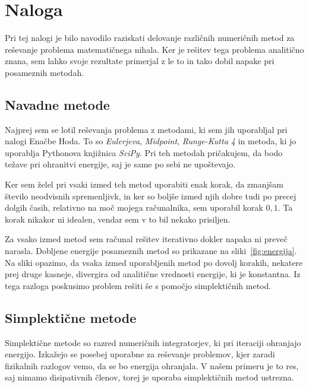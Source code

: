 \documentclass{porocilo}
\begin{document}
\section{Naloga}
Pri tej nalogi je bilo navodilo raziskati delovanje različnih numeričnih metod za reševanje problema matematičnega nihala. Ker je rešitev tega problema analitično znana, sem lahko svoje rezultate primerjal z le to in tako dobil napake pri posameznih metodah.

\subsection{Navadne metode}
Najprej sem se lotil reševanja problema z metodami, ki sem jih uporabljal pri nalogi Enačbe Hoda. To so \textit{Eulerjeva}, \textit{Midpoint}, \textit{Runge-Kutta 4} in metoda, ki jo uporablja Pythonova knjižnica \textit{SciPy}. Pri teh metodah pričakujem, da bodo težave pri ohranitvi energije, saj je same po sebi ne upoštevajo.

Ker sem želel pri vsaki izmed teh metod uporabiti enak korak, da zmanjšam število neodvisnih spremenljivk, in ker so boljše izmed njih dobre tudi po precej dolgih časih, relativno na moč mojega računalnika, sem uporabil korak $0,1$. Ta korak nikakor ni idealen, vendar sem v to bil nekako prisiljen.

Za vsako izmed metod sem računal rešitev iterativno dokler napaka ni preveč narasla. Dobljene energije posameznih metod so prikazane na sliki~\ref{fig:energija}. Na sliki opazimo, da vsaka izmed uporabljenih metod po dovolj korakih, nekatere prej druge kasneje, divergira od analitične vrednosti energije, ki je konstantna. Iz tega razloga poskusimo problem rešiti še s pomočjo simplektičnih metod.


\subsection{Simplektične metode}
Simplektične metode so razred numeričnih integratorjev, ki pri iteraciji ohranjajo energijo. Izkažejo se posebej uporabne za reševanje problemov, kjer zaradi fizikalnih razlogov vemo, da se bo energija ohranjala. V našem primeru je to res, saj nimamo disipativnih členov, torej je uporaba simplektičnih metod ustrezna.
\end{document}
